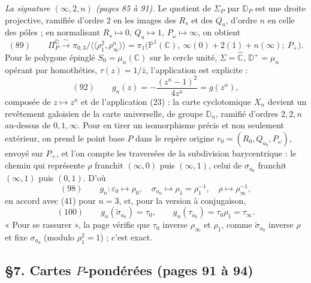 \documentclass[11pt,a4paper]{article}
\begin{document}
\emph{La signature $(\infty, 2, n)$ (pages 85 à 91).} Le quotient de
$\Sigma_P$ par $\mathbb{D}_P$ est une droite projective, ramifiée d'ordre $2$
en les images des $R_s$ et des $Q_a$, d'ordre $n$ en celle des pôles ; en
normalisant $R_s \mapsto 0$, $Q_a \mapsto 1$, $P_\omega \mapsto \infty$, on
obtient
\[
(89)\qquad \Pi^{\mathbb{D}}_P \xrightarrow{\ \sim\ } \pi_{0,3}/\langle\langle \rho_1^2, \rho_\infty^n \rangle\rangle
= \pi_1\bigl(\mathbb{P}^1(\mathbb{C}),\ \infty(0) + 2(1) + n(\infty);\ P_+\bigr).
\]
Pour le polygone épinglé $S_0 = \mu_n(\mathbb{C})$ sur le cercle unité,
$\Sigma = \widehat{\mathbb{C}}$, $\mathbb{D}^+ = \mu_n$ opérant par homothéties,
$\tau(z) = 1/\bar z$, l'application est explicite :
\[
(92)\qquad g_n(z) = -\frac{(z^n - 1)^2}{4z^n} = g(z^n),
\]
composée de $z \mapsto z^n$ et de l'application (23) : la carte cyclotomique
$X_n$ devient un revêtement galoisien de la carte universelle, de groupe
$\mathbb{D}_n$, ramifié d'ordres $2, 2, n$ au-dessus de $0, 1, \infty$.
Pour en tirer un isomorphisme précis et non seulement extérieur, on prend le
point base $P$ dans le repère origine $r_0 = (R_0, Q_{a_0}, P_\omega)$, envoyé
sur $P_+$, et l'on compte les traversées de la subdivision barycentrique : le
chemin qui représente $\rho$ franchit $(\infty, 0)$ puis $(\infty, 1)$, celui de
$\sigma_{a_0}$ franchit $(\infty, 1)$ puis $(0, 1)$. D'où
\[
(98)\qquad g_n : \varepsilon_0 \mapsto \rho_0, \quad \sigma_{a_0} \mapsto \rho_1 = \rho_1^{-1}, \quad \rho \mapsto \rho_\infty^{-1},
\]
en accord avec (41) pour $n = 3$, et, pour la version à conjugaison,
\[
(100)\qquad g_n(\tilde\sigma_{a_0}) = \tau_0, \qquad g_n(\tau_{a_0}) = \tau_0\rho_1 = \tau_\infty .
\]
« Pour se rassurer », la page vérifie que $\tau_0$ inverse $\rho_\infty$ et
$\rho_1$, comme $\tilde\sigma_{a_0}$ inverse $\rho$ et fixe $\sigma_{a_0}$
(modulo $\rho_1^2 = 1$) ; c'est exact.

\subsection*{§7. Cartes $P$-pondérées (pages 91 à 94)}
\end{document}
